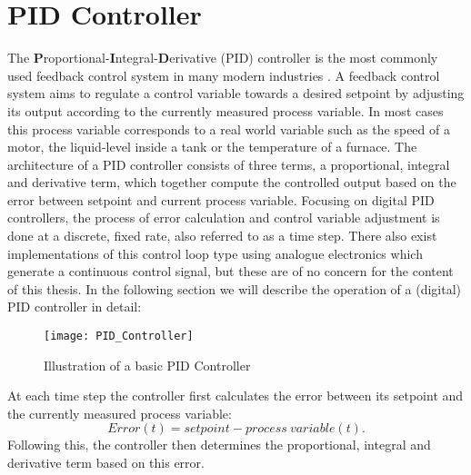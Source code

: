 \section{PID Controller}
The \textbf{P}roportional-\textbf{I}ntegral-\textbf{D}erivative (PID) controller is the most commonly used feedback control system in many modern industries \parencite{aastrom2002control}.
A feedback control system aims to regulate a control variable towards a desired setpoint by adjusting its output according to the currently measured process variable.
In most cases this process variable corresponds to a real world variable such as the speed of a motor, the liquid-level inside a tank or the temperature of a furnace.
The architecture of a PID controller consists of three terms, a proportional, integral and derivative term, which together compute the controlled output based on the error between setpoint and current process variable.
Focusing on digital PID controllers, the process of error calculation and control variable adjustment is done at a discrete, fixed rate, also referred to as a time step.
There also exist implementations of this control loop type using analogue electronics which generate a continuous control signal, but these are of no concern for the content of this thesis.
In the following section we will describe the operation of a (digital) PID controller in detail:

\begin{figure}[h]
	\centerline{\texttt{[image: PID\_Controller]}}
	\caption{Illustration of a basic PID Controller}
	\label{figure: PID Controller}
\end{figure}


At each time step the controller first calculates the error between its setpoint and the currently measured process variable: 
\[
	Error(t) = setpoint - process\ variable(t)
.\]
Following this, the controller then determines the proportional, integral and derivative term based on this error.

